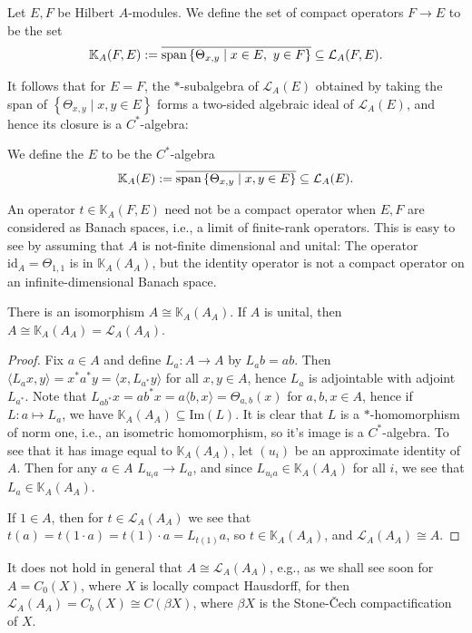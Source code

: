 \begin{definition}
	Let $E,F$ be Hilbert $A$-modules. We define the set of compact operators $F \to E$ to be the set
	\begin{align*}
		\mathbb{K}_A(F,E) := \overline{\mathrm{span}\left\{ \Theta_{x,y} \mid x \in E, \ y \in F \right\}}\subseteq \mathcal{L}_A(F,E).
	\end{align*}
\end{definition}
It follows that for $E=F$, the $*$-subalgebra of $\mathcal{L}_A(E)$ obtained by taking the span of $\left\{ \Theta_{x,y} \mid x,y \in E \right\}$ forms a two-sided algebraic ideal of $\mathcal{L}_A(E)$, and hence its closure is a $C^*$-algebra:
\begin{definition}
We define the  $E$ to be the $C^*$-algebra
	\begin{align*}
		\mathbb{K}_A(E):= \overline{\mathrm{span}\left\{ \Theta_{x,y} \mid x,y \in E \right\}} \subseteq \mathcal{L}_A(E).
	\end{align*}
\end{definition}
\begin{note}
	An operator $t \in \mathbb{K}_A(F,E)$ need not be a compact operator when $E,F$ are considered as Banach spaces, i.e., a limit of finite-rank operators. This is easy to see by assuming that $A$ is not-finite dimensional and unital: The operator $\mathrm{id}_A =\Theta_{1,1}$ is in $\mathbb{K}_A(A_A)$, but the identity operator is not a compact operator on an infinite-dimensional Banach space.
\end{note}
\begin{lemma}
	There is an isomorphism $A \cong \mathbb{K}_A(A_A)$. If $A$ is unital, then $A \cong \mathbb{K}_A(A_A) = \mathcal{L}_A(A_A)$.
	\label{mult:AisocompA}
\end{lemma}
\begin{proof}
	Fix $a \in A$ and define $L_a \colon A \to A$ by $L_ab=ab$. Then $\langle L_ax,y \rangle = x^* a^*y = \langle x, L_{a^*}y\rangle$ for all $x,y \in A$, hence $L_a$ is adjointable with adjoint $L_{a^*}$. Note that $L_{ab^*}x = ab^*x = a\langle b,x \rangle = \Theta_{a,b}(x)$ for $a,b,x \in A$, hence if $L\colon a \mapsto L_a$, we have $\mathbb{K}_A(A_A) \subseteq \mathrm{Im}(L)$. It is clear that $L$ is a $*$-homomorphism of norm one, i.e., an isometric homomorphism, so it's image is a $C^*$-algebra. To see that it has image equal to $\mathbb{K}_A(A_A)$, let $(u_i)$ be an approximate identity of $A$. Then for any $a \in A$ $L_{u_i a} \to L_{a}$, and since $L_{u_ia} \in \mathbb{K}_{A}(A_A)$ for all $i$, we see that $L_a \in \mathbb{K}_A(A_A)$.

	If $1 \in A$, then for $t \in \mathcal{L}_A(A_A)$ we see that $t(a)=t(1\cdot a)=t(1)\cdot a=L_{t(1)}a$, so $t \in \mathbb{K}_A(A_A)$, and $\mathcal{L}_A(A_A) \cong A$.
\end{proof}
\begin{note}
	It does not hold in general that $A \cong \mathcal{L}_A(A_A)$, e.g., as we shall see soon for $A=C_0(X)$, where $X$ is locally compact Hausdorff, for then $\mathcal{L}_A(A_A) = C_b(X) \cong C(\beta X)$, where $\beta X$ is the Stone-\v{C}ech compactification of $X$.
\end{note}

